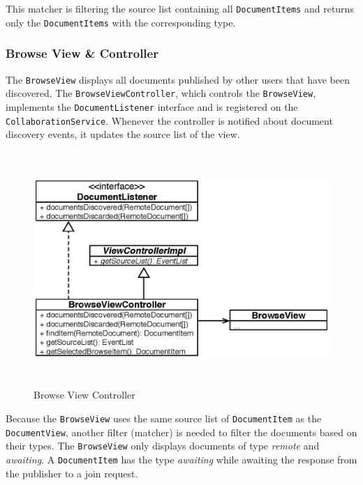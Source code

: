 This matcher is filtering the source list containing all \texttt{Document\-Items} and returns only the \texttt{Document\-Items} with the corresponding type.

\subsubsection{Browse View \& Controller}
The \texttt{Browse\-View} displays all documents published by other users that have been discovered. The \texttt{Browse\-View\-Controller}, which controls the \texttt{Browse\-View}, implements the \texttt{Document\-Listener} interface and is registered on the \texttt{Collaboration\-Service}. Whenever the controller is notified about document discovery events, it updates the source list of the view.

\begin{figure}[H]
\begin{center}
  \includegraphics[height=3.5in, width=5.62in]{../images/finalreport/application_browseview.eps}
\caption{Browse View Controller}
\label{application_browseview}
\end{center}
\end{figure}

Because the \texttt{Browse\-View} uses the same source list of \texttt{Document\-Item} as the \texttt{Document\-View}, another filter (matcher) is needed to filter the documents based on their types. The \texttt{Browse\-View} only displays documents of type \emph{remote} and \emph{awaiting}. A \texttt{Document\-Item} has the type \emph{awaiting} while awaiting the response from the publisher to a join request.


